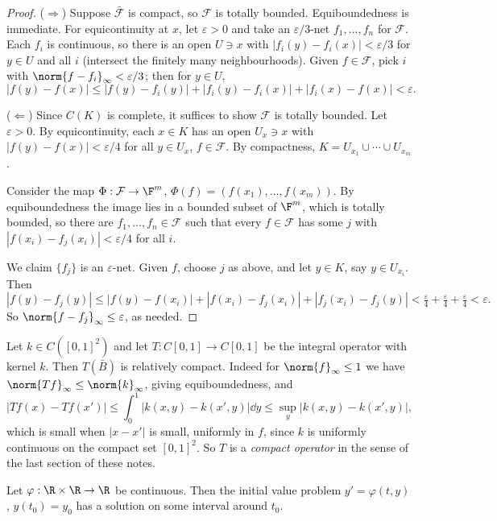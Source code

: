 \begin{proof}
	($\Rightarrow$) Suppose $\bar{\mathcal F}$ is compact, so $\mathcal F$ is totally bounded. Equiboundedness is immediate. For equicontinuity at $x$, let $\varepsilon>0$ and take an $\varepsilon/3$-net $f_1,\dots,f_n$ for $\mathcal{F}$. Each $f_i$ is continuous, so there is an open $U \ni x$ with $|f_i(y)-f_i(x)| < \varepsilon/3$ for $y \in U$ and all $i$ (intersect the finitely many neighbourhoods). Given $f \in \mathcal F$, pick $i$ with $\norm{f - f_i}_\infty < \varepsilon/3$; then for $y \in U$,
	$$|f(y)-f(x)| \leq |f(y)-f_i(y)| + |f_i(y)-f_i(x)| + |f_i(x)-f(x)| < \varepsilon.$$

	($\Leftarrow$) Since $C(K)$ is complete, it suffices to show $\mathcal F$ is totally bounded. Let $\varepsilon > 0$. By equicontinuity, each $x \in K$ has an open $U_x \ni x$ with $|f(y)-f(x)| < \varepsilon/4$ for all $y \in U_x$, $f \in \mathcal{F}$. By compactness, $K = U_{x_1}\cup\cdots\cup U_{x_m}$.

	Consider the map $\Phi : \mathcal{F} \to \F^m$, $\Phi(f) = (f(x_1),\dots,f(x_m))$. By equiboundedness the image lies in a bounded subset of $\F^m$, which is totally bounded, so there are $f_1, \dots, f_n \in \mathcal{F}$ such that every $f \in \mathcal{F}$ has some $j$ with $|f(x_i) - f_j(x_i)| < \varepsilon/4$ for all $i$.

	We claim $\{f_j\}$ is an $\varepsilon$-net. Given $f$, choose $j$ as above, and let $y \in K$, say $y \in U_{x_i}$. Then
	$$|f(y)-f_j(y)| \leq |f(y)-f(x_i)| + |f(x_i)-f_j(x_i)| + |f_j(x_i)-f_j(y)| < \tfrac\varepsilon4+\tfrac\varepsilon4+\tfrac\varepsilon4 < \varepsilon.$$
	So $\norm{f - f_j}_\infty \leq \varepsilon$, as needed.
\end{proof}

\begin{example}
	Let $k \in C([0,1]^2)$ and let $T : C[0,1]\to C[0,1]$ be the integral operator with kernel $k$. Then $T(\bar B)$ is relatively compact. Indeed for $\norm{f}_\infty \leq 1$ we have $\norm{Tf}_\infty \leq \norm{k}_\infty$, giving equiboundedness, and
	$$|Tf(x) - Tf(x')| \leq \int_0^1 |k(x,y)-k(x',y)|\dd y \leq \sup_y |k(x,y)-k(x',y)|,$$
	which is small when $|x - x'|$ is small, uniformly in $f$, since $k$ is uniformly continuous on the compact set $[0,1]^2$. So $T$ is a \emph{compact operator} in the sense of the last section of these notes.
\end{example}

\begin{theorem}
	Let $\varphi : \R \times \R \to \R$ be continuous. Then the initial value problem $y' = \varphi(t,y)$, $y(t_0) = y_0$ has a solution on some interval around $t_0$.
\end{theorem}

